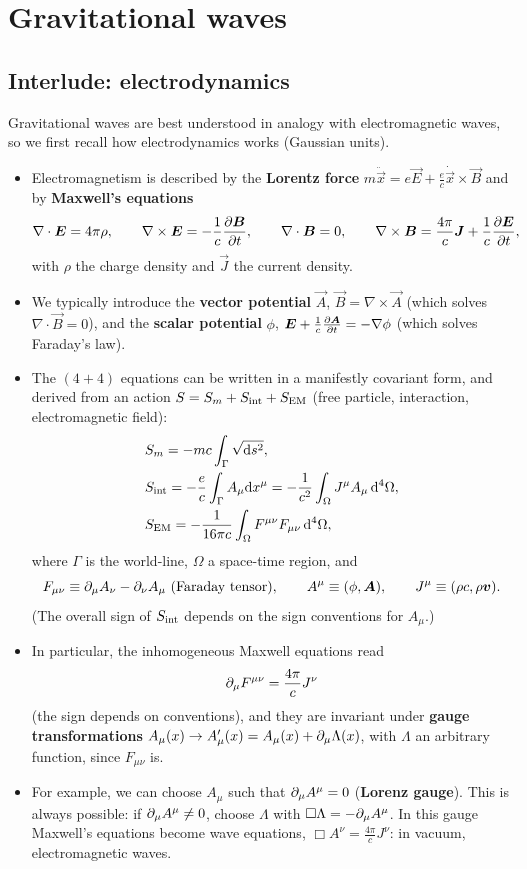 \chapter{Gravitational waves}\label{ch:gw}

\section{Interlude: electrodynamics}

Gravitational waves are best understood in analogy with electromagnetic waves, so we first recall how electrodynamics works (Gaussian units).
\begin{itemize}
\item Electromagnetism is described by the \textbf{Lorentz force} $m\ddot{\vec x}=e\vec E+\frac ec\dot{\vec x}\times\vec B$ and by \textbf{Maxwell's equations}
\[
  \nabla\cdot\bm{E}=4\pi\rho,\qquad\nabla\times\bm{E}=-\frac1c\frac{\partial\bm{B}}{\partial t},\qquad\nabla\cdot\bm{B}=0,\qquad\nabla\times\bm{B}=\frac{4\pi}{c}\bm{J}+\frac1c\frac{\partial\bm{E}}{\partial t},
\]
with $\rho$ the charge density and $\vec J$ the current density.
\item We typically introduce the \textbf{vector potential} $\vec A$, $\vec B=\nabla\times\vec A$ (which solves $\nabla\cdot\vec B=0$), and the \textbf{scalar potential} $\phi$, $\bm{E}+\frac1c\frac{\partial\bm{A}}{\partial t}=-\nabla\phi$ (which solves Faraday's law).
\item The $(4+4)$ equations can be written in a manifestly covariant form, and derived from an action $S=S_m+S_{\rm int}+S_{\rm EM}$ (free particle, interaction, electromagnetic field):
\begin{align*}
  &S_m=-mc\int_\Gamma\sqrt{\mathrm{d} s^2},\\
  &S_{\rm int}=-\frac ec\int_\Gamma A_\mu\mathrm{d} x^\mu=-\frac{1}{c^2}\int_\Omega J^\mu A_\mu\,\mathrm{d}^4\Omega,\\
  &S_{\rm EM}=-\frac{1}{16\pi c}\int_\Omega F^{\mu\nu}F_{\mu\nu}\,\mathrm{d}^4\Omega,
\end{align*}
where $\Gamma$ is the world-line, $\Omega$ a space-time region, and
\[
  F_{\mu\nu}\equiv\pd_\mu A_\nu-\pd_\nu A_\mu\ \text{(Faraday tensor)},\qquad A^\mu\equiv(\phi,\vec A),\qquad J^\mu\equiv(\rho c,\rho\vec v).
\]
(The overall sign of $S_{\rm int}$ depends on the sign conventions for $A_\mu$.)
\item In particular, the inhomogeneous Maxwell equations read
\begin{equation}
  \partial_\mu F^{\mu\nu}=\frac{4\pi}{c}J^\nu
\end{equation}
(the sign depends on conventions), and they are invariant under \textbf{gauge transformations} $A_\mu(x)\to A'_\mu(x)=A_\mu(x)+\partial_\mu\Lambda(x)$, with $\Lambda$ an arbitrary function, since $F_{\mu\nu}$ is.
\item For example, we can choose $A_\mu$ such that $\partial_\mu A^\mu=0$ (\textbf{Lorenz gauge}). This is always possible: if $\partial_\mu A^\mu\neq0$, choose $\Lambda$ with $\square\Lambda=-\partial_\mu A^\mu$. In this gauge Maxwell's equations become wave equations, $\Box A^\nu=\frac{4\pi}{c}J^\nu$: in vacuum, electromagnetic waves.
\end{itemize}
